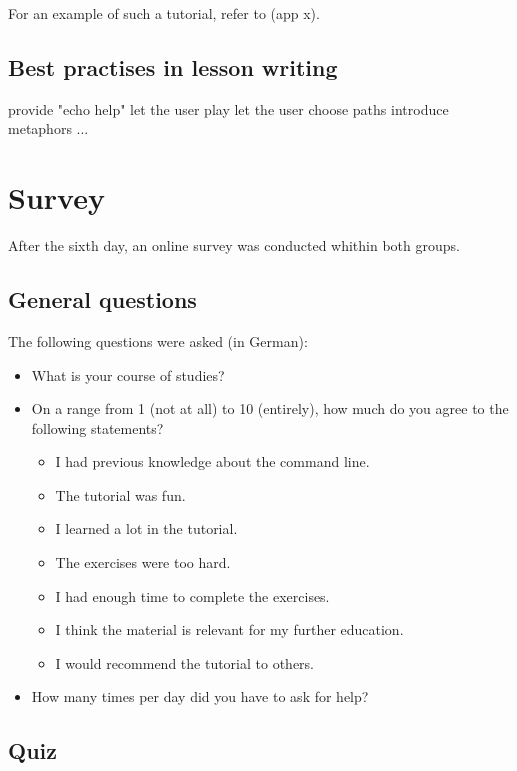 \documentclass[paper=a4,abstract=on,cleardoublepage=empty,numbers=noenddot,toc=bib]{scrreprt}
\begin{document}
For an example of such a tutorial, refer to (app x).

\subsection{Best practises in lesson writing}

provide "echo help"
let the user play
let the user choose paths
introduce metaphors
...

\section{Survey}

After the sixth day, an online survey was conducted whithin both groups.

\subsection{General questions}

The following questions were asked (in German):

\begin{itemize}
    \item What is your course of studies?
    \item On a range from 1 (not at all) to 10 (entirely), how much do you agree to the following statements?
        \begin{itemize}
            \item I had previous knowledge about the command line.
            \item The tutorial was fun.
            \item I learned a lot in the tutorial.
            \item The exercises were too hard.
            \item I had enough time to complete the exercises.
            \item I think the material is relevant for my further education.
            \item I would recommend the tutorial to others.
        \end{itemize}
    \item How many times per day did you have to ask for help?
\end{itemize}

\subsection{Quiz}
\end{document}
